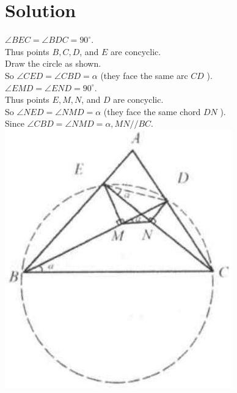 \documentclass{article}
\begin{document}
\section*{Solution}
\(\angle B E C=\angle B D C=90^{\circ}\).\\
Thus points \(B, C, D\), and \(E\) are concyclic.\\
Draw the circle as shown.\\
So \(\angle C E D=\angle C B D=\alpha\) (they face the same arc \(C D\) ).\\
\(\angle E M D=\angle E N D=90^{\circ}\).\\
Thus points \(E, M, N\), and \(D\) are concyclic.\\
So \(\angle N E D=\angle N M D=\alpha\) (they face the same chord \(D N\) ).\\
Since \(\angle C B D=\angle N M D=\alpha, M N / / B C\).\\
\centering
\includegraphics[width=\textwidth]{images/reasoning_image_1.jpg}
\end{document}

